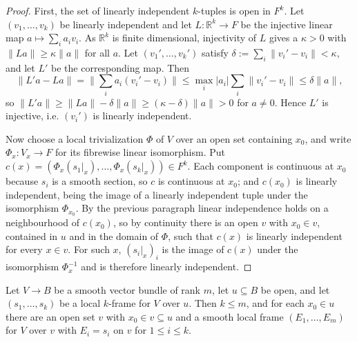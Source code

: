 \begin{proof}
\leanok
First, the set of linearly independent $k$-tuples is open in $F^k$. Let $(v_1, \ldots, v_k)$ be linearly independent and let $L : \mathbb{R}^k \to F$ be the injective linear map $a \mapsto \sum_i a_i v_i$. As $\mathbb{R}^k$ is finite dimensional, injectivity of $L$ gives a $\kappa > 0$ with $\|La\| \geq \kappa \|a\|$ for all $a$. Let $(v_1', \ldots, v_k')$ satisfy $\delta := \sum_i \|v_i' - v_i\| < \kappa$, and let $L'$ be the corresponding map. Then
\[
\|L'a - La\| = \Big\| \sum_i a_i (v_i' - v_i) \Big\| \leq \max_i |a_i| \sum_i \|v_i' - v_i\| \leq \delta \|a\|,
\]
so $\|L'a\| \geq \|La\| - \delta\|a\| \geq (\kappa - \delta)\|a\| > 0$ for $a \neq 0$. Hence $L'$ is injective, i.e. $(v_i')$ is linearly independent.

Now choose a local trivialization $\Phi$ of $V$ over an open set containing $x_0$, and write $\Phi_x : V_x \to F$ for its fibrewise linear isomorphism. Put $c(x) = (\Phi_x(s_1|_x), \ldots, \Phi_x(s_k|_x)) \in F^k$. Each component is continuous at $x_0$ because $s_i$ is a smooth section, so $c$ is continuous at $x_0$; and $c(x_0)$ is linearly independent, being the image of a linearly independent tuple under the isomorphism $\Phi_{x_0}$. By the previous paragraph linear independence holds on a neighbourhood of $c(x_0)$, so by continuity there is an open $v$ with $x_0 \in v$, contained in $u$ and in the domain of $\Phi$, such that $c(x)$ is linearly independent for every $x \in v$. For such $x$, $(s_i|_x)_i$ is the image of $c(x)$ under the isomorphism $\Phi_x^{-1}$ and is therefore linearly independent.
\end{proof}

\begin{lemma}
\label{lem:partial-frame-extension}
\leanok
{}
Let $V \to B$ be a smooth vector bundle of rank $m$, let $u \subseteq B$ be open, and let $(s_1, \ldots, s_k)$ be a local $k$-frame for $V$ over $u$. Then $k \leq m$, and for each $x_0 \in u$ there are an open set $v$ with $x_0 \in v \subseteq u$ and a smooth local frame $(E_1, \ldots, E_m)$ for $V$ over $v$ with $E_i = s_i$ on $v$ for $1 \leq i \leq k$.
\end{lemma}

